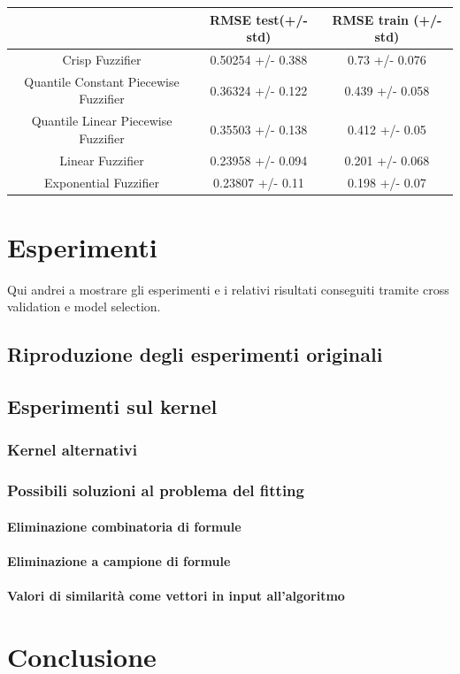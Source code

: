 \documentclass[12pt,a4paper]{report}
\begin{document}
\begin{table}[h!]
\centering 	
	\begin{tabular}{|c|c|c|} 
	 \hline
	  & RMSE test(+/- std) & RMSE train (+/- std)\\ [0.5ex] 
	 \hline
	 Crisp Fuzzifier & 0.50254 +/- 0.388 & 0.73 +/- 0.076 \\ 
	 \hline
	 Quantile Constant Piecewise Fuzzifier & 0.36324 +/- 0.122 & 0.439 +/- 0.058\\
	 \hline
	 Quantile Linear Piecewise Fuzzifier & 0.35503 +/- 0.138	 & 0.412 +/- 0.05\\
	 \hline
	 Linear Fuzzifier & 0.23958 +/- 0.094 & 0.201 +/- 0.068\\
	 \hline
	 Exponential Fuzzifier & 0.23807 +/- 0.11 & 0.198 +/- 0.07\\ [1ex] 
	 \hline
	\end{tabular}
\end{table}


\chapter{Esperimenti}
Qui andrei a mostrare gli esperimenti e i relativi risultati conseguiti tramite cross validation e model selection.
\section{Riproduzione degli esperimenti originali}
\section{Esperimenti sul kernel}
\subsection{Kernel alternativi}
\subsection{Possibili soluzioni al problema del fitting}
\subsubsection{Eliminazione combinatoria di formule}
\subsubsection{Eliminazione a campione di formule}
\subsubsection{Valori di similarità come vettori in input all'algoritmo}

\chapter*{Conclusione}



\end{document}
